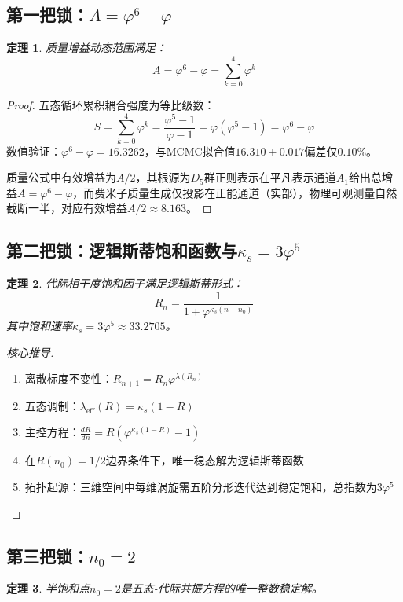 \documentclass[12pt,a4paper,twocolumn]{article}
\renewcommand{\phi}{\varphi}
\newtheorem{theorem}{定理}[section]
\begin{document}
\subsection{第一把锁：$A=\phi^6-\phi$}
\begin{theorem}
质量增益动态范围满足：
\[
A = \phi^6 - \phi = \sum_{k=0}^4 \phi^k
\]
\end{theorem}

\begin{proof}
五态循环累积耦合强度为等比级数：
\[
S = \sum_{k=0}^4 \phi^k = \frac{\phi^5-1}{\phi-1} = \phi(\phi^5-1) = \phi^6-\phi
\]
数值验证：$\phi^6-\phi = 16.3262$，与MCMC拟合值$16.310\pm0.017$偏差仅$0.10\%$。

质量公式中有效增益为$A/2$，其根源为$D_5$群正则表示在平凡表示通道$A_1$给出总增益$A=\phi^6-\phi$，而费米子质量生成仅投影在正能通道（实部），物理可观测量自然截断一半，对应有效增益$A/2\approx 8.163$。
\end{proof}

\subsection{第二把锁：逻辑斯蒂饱和函数与$\kappa_s=3\phi^5$}
\begin{theorem}
代际相干度饱和因子满足逻辑斯蒂形式：
\[
R_n = \frac{1}{1+\phi^{\kappa_s(n-n_0)}}
\]
其中饱和速率$\kappa_s = 3\phi^5 \approx 33.2705$。
\end{theorem}

\begin{proof}[核心推导]
\begin{enumerate}
\item 离散标度不变性：$R_{n+1} = R_n \phi^{\lambda(R_n)}$
\item 五态调制：$\lambda_{\text{eff}}(R) = \kappa_s(1-R)$
\item 主控方程：$\displaystyle \frac{dR}{dn} = R(\phi^{\kappa_s(1-R)}-1)$
\item 在$R(n_0)=1/2$边界条件下，唯一稳态解为逻辑斯蒂函数
\item 拓扑起源：三维空间中每维涡旋需五阶分形迭代达到稳定饱和，总指数为$3\phi^5$
\end{enumerate}
\end{proof}

\subsection{第三把锁：$n_0=2$}
\begin{theorem}
半饱和点$n_0=2$是五态-代际共振方程的唯一整数稳定解。
\end{theorem}
\end{document}
